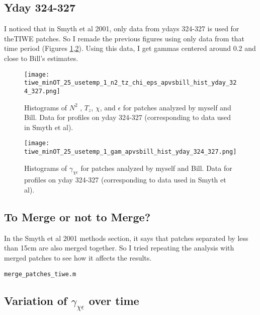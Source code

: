 \documentclass[11pt]{article}
\begin{document}
\clearpage
\subsection{Yday 324-327}

I noticed that in Smyth et al 2001, only data from ydays 324-327 is used for theTIWE patches. So I remade the previous figures using only data from that time period (Figures \ref{comp_bill_ap_324_327},\ref{comp_bill_ap_gam_324_327}). Using this data, I get  gammas centered around 0.2 and close to Bill's estimates. 

\begin{figure}[htbp]
\texttt{[image: tiwe\_minOT\_25\_usetemp\_1\_n2\_tz\_chi\_eps\_apvsbill\_hist\_yday\_324\_327.png]}
\caption{Histograms of $N^2$ , $T_z$, $\chi$, and $\epsilon$ for patches analyzed by myself and Bill. Data for profiles on yday 324-327 (corresponding to data used in Smyth et al).}
\label{comp_bill_ap_324_327}
\end{figure}


\begin{figure}[htbp]
\texttt{[image: tiwe\_minOT\_25\_usetemp\_1\_gam\_apvsbill\_hist\_yday\_324\_327.png]}
\caption{Histograms of $\gamma_{\chi\epsilon}$ for patches analyzed by myself and Bill. Data for profiles on yday 324-327 (corresponding to data used in Smyth et al).}
\label{comp_bill_ap_gam_324_327}
\end{figure}






\clearpage
\subsection{To Merge or not to Merge?}

In the Smyth et al 2001 methods section, it says that patches separated by less than 15cm are also merged together. So I tried repeating the analysis with merged patches to see how it affects the results.

\verb+merge_patches_tiwe.m+







\clearpage
\subsection{Variation of $\gamma_{\chi\epsilon}$ over time}
\end{document}
